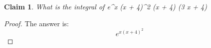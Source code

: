 \documentclass{article}
\newtheorem{theorem}{Claim}
\begin{document}
\begin{theorem}
What is the integral of e^{x \left(x + 4\right)^{2}} \left(x + 4\right) \left(3 x + 4\right)
\end{theorem}

\begin{proof}
The answer is:
\[
e^{x (x+4)^2}
\]
\end{proof}
\end{document}
